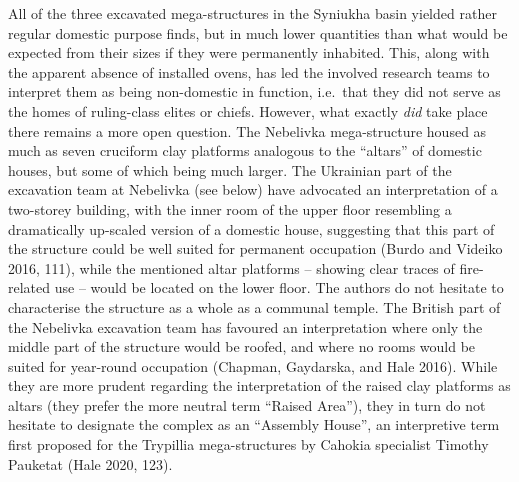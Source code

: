 \documentclass[
  12pt,
  a4paper, twoside]{book}
\begin{document}
All of the three excavated mega-structures in the Syniukha basin yielded rather regular domestic purpose finds, but in much lower quantities than what would be expected from their sizes if they were permanently inhabited. This, along with the apparent absence of installed ovens, has led the involved research teams to interpret them as being non-domestic in function, i.e.~that they did not serve as the homes of ruling-class elites or chiefs. However, what exactly \emph{did} take place there remains a more open question. The Nebelivka mega-structure housed as much as seven cruciform clay platforms analogous to the ``altars'' of domestic houses, but some of which being much larger. The Ukrainian part of the excavation team at Nebelivka (see below) have advocated an interpretation of a two-storey building, with the inner room of the upper floor resembling a dramatically up-scaled version of a domestic house, suggesting that this part of the structure could be well suited for permanent occupation (Burdo and Videiko 2016, 111), while the mentioned altar platforms -- showing clear traces of fire-related use -- would be located on the lower floor. The authors do not hesitate to characterise the structure as a whole as a communal temple. The British part of the Nebelivka excavation team has favoured an interpretation where only the middle part of the structure would be roofed, and where no rooms would be suited for year-round occupation (Chapman, Gaydarska, and Hale 2016). While they are more prudent regarding the interpretation of the raised clay platforms as altars (they prefer the more neutral term ``Raised Area''), they in turn do not hesitate to designate the complex as an ``Assembly House'', an interpretive term first proposed for the Trypillia mega-structures by Cahokia specialist Timothy Pauketat (Hale 2020, 123).
\end{document}
